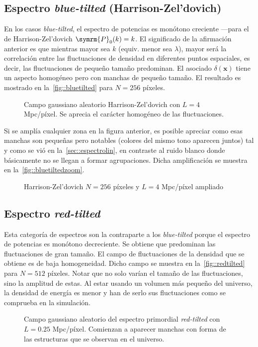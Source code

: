 \subsection{Espectro \textit{blue-tilted} (Harrison-Zel'dovich)}
En los casos \textit{blue-tilted}, el espectro de potencias es monótono creciente ---para el de Harrison-Zel'dovich \(\symrm{P}_0(k)=k\). El significado de la afirmación anterior es que mientras mayor sea \(k\) (equiv. menor sea \(\lambda\)), mayor será la correlación entre las fluctuaciones de densidad en diferentes puntos espaciales, es decir, las fluctuaciones de pequeño tamaño predominan. El asociado \(\delta(\symbf{x})\) tiene un aspecto homogéneo pero con manchas de pequeño tamaño. El resultado es mostrado en la~\autoref{fig::bluetilted} para \(N=256\) píxeles.
\begin{figure}[h]
    \centering
    \scalebox{.835}{}
    \caption[Harrison-Zel'dovich \(N=256\) píxeles y \(L=4\) Mpc/píxel]{Campo gaussiano aleatorio Harrison-Zel'dovich con \(L=4\) Mpc/píxel. Se aprecia el carácter homogéneo de las fluctuaciones.}
    \label{fig::bluetilted}
\end{figure}

Si se amplía cualquier zona en la figura anterior, es posible apreciar como esas manchas son pequeñas pero notables (colores del mismo tono aparecen juntos) tal y como se vió en la~\autoref{sec::espectrolin}, en contraste al ruido blanco donde básicamente no se llegan a formar agrupaciones. Dicha amplificación se muestra en la~\autoref{fig::bluetiltedzoom}.
\begin{figure}[ht]
    \centering
    \scalebox{.85}{}
    \caption{Harrison-Zel'dovich \(N=256\) píxeles y \(L=4\) Mpc/píxel ampliado}
    \label{fig::bluetiltedzoom}
\end{figure}
\subsection{Espectro \textit{red-tilted}}
Esta categoría de espectros son la contraparte a los \textit{blue-tilted} porque el espectro de potencias es monótono decreciente. Se obtiene que predominan las fluctuaciones de gran tamaño. El campo de fluctuaciones de la densidad que se obtiene es de baja homogeneidad. Dicho campo se muestra en la~\autoref{fig::redtilted} para \(N=512\) píxeles. Notar que no solo varían el tamaño de las fluctuaciones, sino la amplitud de estas. Al estar usando un volumen más pequeño del universo, la densidad de energía es menor y han de serlo sus fluctuaciones como se comprueba en la simulación.
\begin{figure}[ht]
    \centering
    \scalebox{.85}{}
    \caption[Espectro primordial \textit{red-tilted} \(N=512\) píxeles y \(L=0.25\) Mpc/píxel]{Campo gaussiano aleatorio del espectro primordial \textit{red-tilted} con \(L=0.25\) Mpc/píxel. Comienzan a aparecer manchas con forma de las estructuras que se observan en el universo.}
    \label{fig::redtilted}
\end{figure}
